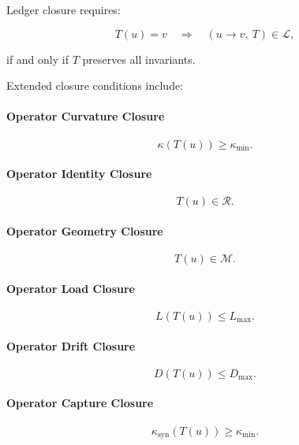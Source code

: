 \noindent Ledger closure requires:



\[
T(u) = v
\quad \Longrightarrow \quad
(u \rightarrow v,\ T) \in \mathcal{L},
\]


if and only if $T$ preserves all invariants.

\medskip

\noindent Extended closure conditions include:

\paragraph{Operator Curvature Closure}


\[
\kappa(T(u)) \ge \kappa_{\min}.
\]



\paragraph{Operator Identity Closure}


\[
T(u) \in \mathcal{R}.
\]



\paragraph{Operator Geometry Closure}


\[
T(u) \in \mathcal{M}.
\]



\paragraph{Operator Load Closure}


\[
L(T(u)) \le L_{\max}.
\]



\paragraph{Operator Drift Closure}


\[
D(T(u)) \le D_{\max}.
\]



\paragraph{Operator Capture Closure}


\[
\kappa_{\mathrm{syn}}(T(u)) \ge \kappa_{\min}.
\]



